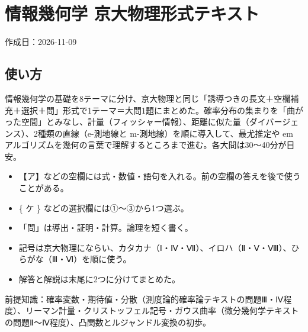 \documentclass[
  10pt,
  a4paper,
]{article}
\author{}
\date{}
\providecommand{\tightlist}{%
  \setlength{\itemsep}{0pt}\setlength{\parskip}{0pt}}
\begin{document}
\hypertarget{ux60c5ux5831ux5e7eux4f55ux5b66-ux4eacux5927ux7269ux7406ux5f62ux5f0fux30c6ux30adux30b9ux30c8}{%
\section{情報幾何学
京大物理形式テキスト}\label{ux60c5ux5831ux5e7eux4f55ux5b66-ux4eacux5927ux7269ux7406ux5f62ux5f0fux30c6ux30adux30b9ux30c8}}

作成日：2026-11-09

\hypertarget{ux4f7fux3044ux65b9}{%
\subsection{使い方}\label{ux4f7fux3044ux65b9}}

情報幾何学の基礎を8テーマに分け、京大物理と同じ「誘導つきの長文＋空欄補充＋選択＋問」形式で1テーマ＝大問1題にまとめた。確率分布の集まりを「曲がった空間」とみなし、計量（フィッシャー情報）、距離に似た量（ダイバージェンス）、2種類の直線（e-測地線と
m-測地線）を順に導入して、最尤推定や em
アルゴリズムを幾何の言葉で理解するところまで進む。各大問は30〜40分が目安。

\begin{itemize}
\tightlist
\item
  【ア】などの空欄には式・数値・語句を入れる。前の空欄の答えを後で使うことがある。
\item
  \{ ケ \} などの選択欄には①〜③から1つ選ぶ。
\item
  「問」は導出・証明・計算。論理を短く書く。
\item
  記号は京大物理にならい、カタカナ（Ⅰ・Ⅳ・Ⅶ）、イロハ（Ⅱ・Ⅴ・Ⅷ）、ひらがな（Ⅲ・Ⅵ）を順に使う。
\item
  解答と解説は末尾に2つに分けてまとめた。
\end{itemize}

前提知識：確率変数・期待値・分散（測度論的確率論テキストの問題Ⅲ・Ⅳ程度）、リーマン計量・クリストッフェル記号・ガウス曲率（微分幾何学テキストの問題Ⅱ〜Ⅳ程度）、凸関数とルジャンドル変換の初歩。
\end{document}
